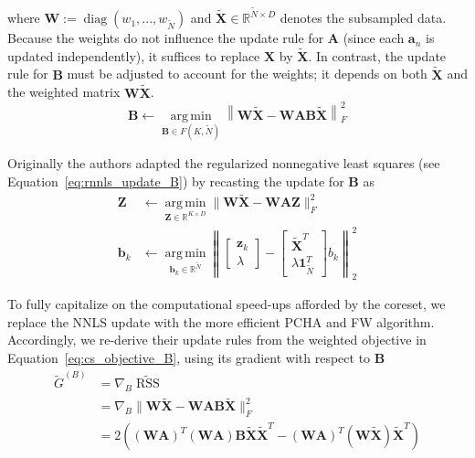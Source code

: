 \documentclass[oneside]{article}
\DeclareMathOperator*{\argmin}{arg\,min}
\begin{document}
where $\mathbf{W} := \operatorname{diag}(w_1, ..., w_{\tilde{N}})$ and $\tilde{\mathbf{X}} \in \mathbb{R}^{\tilde{N} \times D}$ denotes the subsampled data. Because the weights do not influence the update rule for $\mathbf{A}$ (since each $\mathbf{a}_n$ is updated independently), it suffices to replace $\mathbf{X}$ by $\tilde{\mathbf{X}}$. In contrast, the update rule for $\mathbf{B}$ must be adjusted to account for the weights; it depends on both $\tilde{\mathbf{X}}$ and the weighted matrix $\mathbf{W}\tilde{\mathbf{X}}$.\begin{equation}
    \label{eq:cs_objective_B}
    \mathbf{B} \gets \operatorname*{arg\,min}_{\mathbf{B} \in F(K, \tilde{N})} \left\| \mathbf{W} \tilde{\mathbf{X}} - \mathbf{W} \mathbf{A} \mathbf{B} \tilde{\mathbf{X}} \right\|_F^2
\end{equation}

Originally the authors adapted the regularized nonnegative least squares (see Equation~\ref{eq:rnnls_update_B}) by recasting the update for $\mathbf{B}$ as
\begin{equation}
    \begin{aligned}
        \mathbf{Z} &\gets \underset{\mathbf{Z} \in \mathbb{R}^{K \times D}}{\argmin} \| \mathbf{W} \tilde{\mathbf{X}} - \mathbf{W} \mathbf{A} \mathbf{Z}\|_F^2 \\
        \mathbf{b}_k &\gets \underset{\mathbf{b}_k \in \mathbb{R}^{\tilde{N}}}{\argmin} \left\| \begin{bmatrix} \mathbf{z}_k \\ \lambda \end{bmatrix} - \begin{bmatrix} \tilde{\mathbf{X}}^T \\ \lambda \mathbf{1}_{\tilde{N}}^T \end{bmatrix} b_k \right\|_2^2
    \end{aligned}
\end{equation}

To fully capitalize on the computational speed-ups afforded by the coreset, we replace the NNLS update with the more efficient PCHA and FW algorithm.  Accordingly, we re-derive their update rules from the weighted objective in Equation~\ref{eq:cs_objective_B}, using its gradient with respect to $\mathbf{B}$
\begin{equation}
    \label{eq:cs_grad_B}
    \begin{aligned}
        \tilde{G}^{(B)}
        &= \nabla_B \widetilde{\operatorname{RSS}} \\
        &= \nabla_B \| \mathbf{W} \tilde{\mathbf{X}} - \mathbf{W} \mathbf{A} \mathbf{B} \tilde{\mathbf{X}} \|_F^2 \\
        & = 2 \left( \left(\mathbf{W} \mathbf{A} \right)^T  \left(\mathbf{W} \mathbf{A} \right) \mathbf{B} \tilde{\mathbf{X}} \tilde{\mathbf{X}}^T - \left(\mathbf{W} \mathbf{A} \right)^T \left( \mathbf{W} \tilde{\mathbf{X}} \right) \tilde{\mathbf{X}}^T \right)
    \end{aligned}
\end{equation}
\end{document}
